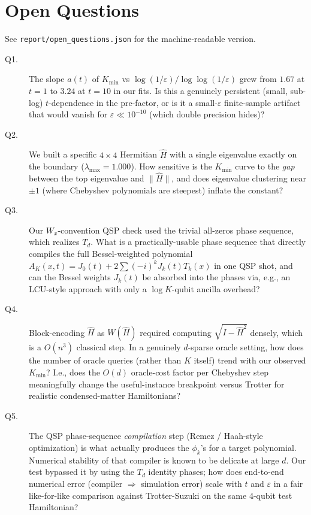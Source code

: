 \documentclass[11pt]{article}
\begin{document}
\section{Open Questions}\label{sec:oq}
See \texttt{report/open\_questions.json} for the machine-readable version.
\begin{description}
\item[Q1.] The slope $a(t)$ of $K_{\min}$ vs $\log(1/\varepsilon)/\log\log(1/\varepsilon)$
   grew from $1.67$ at $t=1$ to $3.24$ at $t=10$ in our fits. Is this a
   genuinely persistent (small, sub-log) $t$-dependence in the pre-factor,
   or is it a small-$\varepsilon$ finite-sample artifact that would vanish
   for $\varepsilon\ll 10^{-10}$ (which double precision hides)?
\item[Q2.] We built a specific $4\times 4$ Hermitian $\hat H$ with a
   single eigenvalue exactly on the boundary ($\lambda_{\max}=1.000$).
   How sensitive is the $K_{\min}$ curve to the \emph{gap} between the
   top eigenvalue and $\|\hat H\|$, and does eigenvalue clustering near
   $\pm 1$ (where Chebyshev polynomials are steepest) inflate the constant?
\item[Q3.] Our $W_x$-convention QSP check used the trivial all-zeros phase
   sequence, which realizes $T_d$. What is a practically-usable phase
   sequence that directly compiles the full Bessel-weighted polynomial
   $A_K(x,t)=J_0(t)+2\sum(-i)^k J_k(t)T_k(x)$ in one QSP shot, and can
   the Bessel weights $J_k(t)$ be absorbed into the phases via, e.g., an
   LCU-style approach with only a $\log K$-qubit ancilla overhead?
\item[Q4.] Block-encoding $\hat H$ as $W(\hat H)$ required computing
   $\sqrt{I-\hat H^2}$ densely, which is a $O(n^3)$ classical step.
   In a genuinely $d$-sparse oracle setting, how does the number of
   oracle queries (rather than $K$ itself) trend with our observed
   $K_{\min}$? I.e., does the $O(d)$ oracle-cost factor per Chebyshev
   step meaningfully change the useful-instance breakpoint versus
   Trotter for realistic condensed-matter Hamiltonians?
\item[Q5.] The QSP phase-sequence \emph{compilation} step (Remez /
   Haah-style optimization) is what actually produces the $\phi_k$'s
   for a target polynomial. Numerical stability of that compiler is
   known to be delicate at large $d$. Our test bypassed it by using the
   $T_d$ identity phases; how does end-to-end numerical error (compiler
   $\Rightarrow$ simulation error) scale with $t$ and $\varepsilon$
   in a fair like-for-like comparison against Trotter-Suzuki on the
   same 4-qubit test Hamiltonian?
\end{description}
\end{document}
